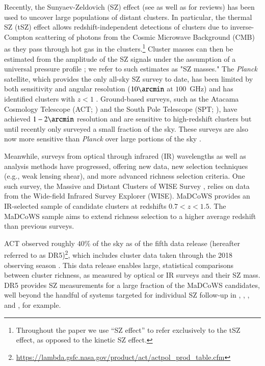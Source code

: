\documentclass[longauth]{aa} %
\begin{document}
Recently, the Sunyaev-Zeldovich (SZ) effect (see \citealt{Sunyaev1970, Sunyaev1972} as well as \citealt{Birkinshaw1999,Carlstrom2002, Mroczkowski2019} for reviews) has been used to uncover large populations of distant clusters. In particular, the thermal SZ (tSZ) effect allows redshift-independent detections of clusters due to inverse-Compton scattering of photons from the Cosmic Microwave Background (CMB) as they pass through hot gas in the clusters.\footnote{Throughout the paper we use ``SZ effect'' to refer exclusively to the tSZ effect, as opposed to the kinetic SZ effect.} Cluster masses can then be estimated from the amplitude of the SZ signals under the assumption of a universal pressure profile \citep[e.g.,][]{Arnaud2010}; we refer to such estimates as "SZ masses." The {\it Planck} satellite, which provides the only all-sky SZ survey to date, has been limited by both sensitivity and angular resolution ($10\arcmin$ at $100$~GHz) and has identified clusters with $z < 1$ \citep{Planck2016XXVII}. Ground-based surveys, such as the Atacama Cosmology Telescope (ACT; \citealt{Fowler2007,Swetz2011, Thornton2016}) and the South Pole Telescope (SPT; \citealt{Carlstrom2011, Benson2014}), have achieved $1-2\arcmin$ resolution and are sensitive to high-redshift clusters but until recently only surveyed a small fraction of the sky. These surveys are also now more sensitive than {\it Planck} over large portions of the sky \citep[see, e.g.,][]{Naess2020}.

Meanwhile, surveys from optical through infrared (IR) wavelengths as well as analysis methods have progressed, offering new data, new selection techniques (e.g., weak lensing shear), and more advanced richness selection criteria.  One such survey, the Massive and Distant Clusters of WISE Survey \citep[MaDCoWS;][]{Gonzalez2019}, relies on data from the Wide-field Infrared Survey Explorer (WISE). MaDCoWS provides an IR-selected sample of candidate clusters at redshifts $0.7<z<1.5$. The MaDCoWS sample aims to extend richness selection to a higher average redshift than previous surveys.  

ACT observed roughly $40\%$ of the sky as of the fifth data release (hereafter referred to as DR5)\footnote{\url{https://lambda.gsfc.nasa.gov/product/act/actpol_prod_table.cfm}}, which includes cluster data taken through the 2018 observing season \citep{Hilton2021}.  This data release enables large, statistical comparisons between cluster richness, as measured by optical or IR surveys and their SZ mass. DR5 provides SZ measurements for a large fraction of the MaDCoWS candidates, well beyond the handful of systems targeted for individual SZ follow-up in \cite{Gonzalez2019}, \cite{Dicker2020}, \cite{DiMascolo2020}, and \cite{Ruppin2020}, for example. 
\end{document}
